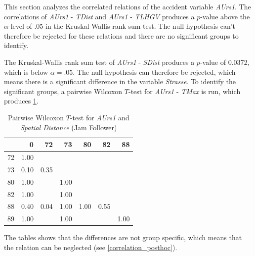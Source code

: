 This section analyzes the correlated relations of the accident variable \textit{AUrs1}. The correlations of \textit{AUrs1} - \textit{TDist} and \textit{AUrs1} - \textit{TLHGV} produces a $p$-value above the $\alpha$-level of .05 in the Kruskal-Wallis rank sum test. The null hypothesis can't therefore be rejected for these relations and there are no significant groups to identify.

The Kruskal-Wallis rank sum test of \textit{AUrs1} - \textit{SDist} produces a $p$-value of 0.0372, which is below $\alpha=.05$. The null hypothesis can therefore be rejected, which means there is a significant difference in the variable \textit{Strasse}. To identify the significant groups, a pairwise Wilcoxon $T$-test for \textit{AUrs1} - \textit{TMax} is run, which produces \cref{tbl:wilcoxon_baysis_follower_AUrs1_SDist}. 
\begin{table}[ht]
	\tiny
	\centering
	\begin{tabular}{rrrrrrr}
		\toprule
		& 0 & 72 & 73 & 80 & 82 & 88 \\ 
		\midrule
		72 & 1.00 &  &  &  &  &  \\ 
		73 & 0.10 & 0.35 &  &  &  &  \\ 
		80 & 1.00 &  & 1.00 &  &  &  \\ 
		82 & 1.00 &  & 1.00 &  &  &  \\ 
		88 & 0.40 & 0.04 & 1.00 & 1.00 & 0.55 &  \\ 
		89 & 1.00 &  & 1.00 &  &  & 1.00 \\ 
		\bottomrule
	  \end{tabular}
    \caption{Pairwise Wilcoxon $T$-test for \textit{AUrs1} and \textit{Spatial Distance} (Jam Follower)}
    \label{tbl:wilcoxon_baysis_follower_AUrs1_SDist}
\end{table}
The tables shows that the differences are not group specific, which means that the relation can be neglected (see \cref{correlation_posthoc}).

